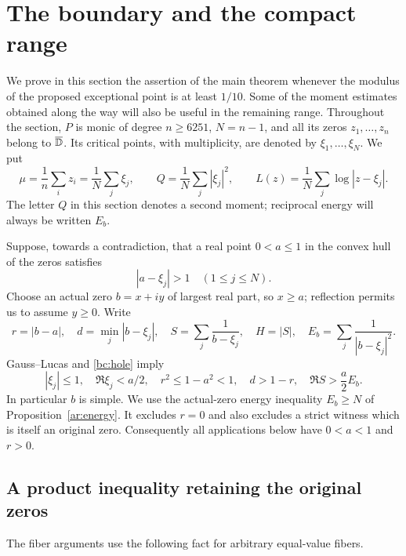 \section{The boundary and the compact range}\label{bc:section}

We prove in this section the assertion of the main theorem whenever the
modulus of the proposed exceptional point is at least $1/10$.  Some of
the moment estimates obtained along the way will also be useful in the
remaining range.  Throughout the section, $P$ is monic of degree $n\ge6251$,
$N=n-1$, and all its zeros $z_1,\ldots,z_n$ belong to $\overline{\mathbb D}$.
Its critical points, with multiplicity, are denoted by
$\xi_1,\ldots,\xi_N$.  We put
\begin{equation}\label{bc:moments-definition}
 \mu=\frac1n\sum_i z_i=\frac1N\sum_j\xi_j,\qquad
 Q=\frac1N\sum_j|\xi_j|^2,\qquad
 L(z)=\frac1N\sum_j\log|z-\xi_j|.
\end{equation}
The letter $Q$ in this section denotes a second moment; reciprocal
energy will always be written $E_b$.

Suppose, towards a contradiction, that a real point $0<a\leq1$ in the
convex hull of the zeros satisfies
\begin{equation}\label{bc:hole}
 |a-\xi_j|>1\quad(1\leq j\leq N).
\end{equation}
Choose an actual zero $b=x+iy$ of largest real part, so $x\geq a$;
reflection permits us to assume $y\geq0$.  Write
\begin{equation}\label{bc:local-notation}
 r=|b-a|,\quad d=\min_j|b-\xi_j|,\quad
 S=\sum_j\frac1{b-\xi_j},\quad H=|S|,\quad
 E_b=\sum_j\frac1{|b-\xi_j|^2}.
\end{equation}
Gauss--Lucas and \eqref{bc:hole} imply
\begin{equation}\label{bc:entrance}
 |\xi_j|\leq1,\quad \Re\xi_j<a/2,\quad
 r^2\leq1-a^2<1,\quad d>1-r,\quad
 \Re S>\frac a2E_b.
\end{equation}
In particular $b$ is simple.  We use the actual-zero energy inequality
$E_b\geq N$ of Proposition~\ref{ar:energy}.  It excludes $r=0$ and also excludes a
strict witness which is itself an original zero.  Consequently all
applications below have $0<a<1$ and $r>0$.

\subsection{A product inequality retaining the original zeros}

The fiber arguments use the following fact for arbitrary equal-value
fibers.

